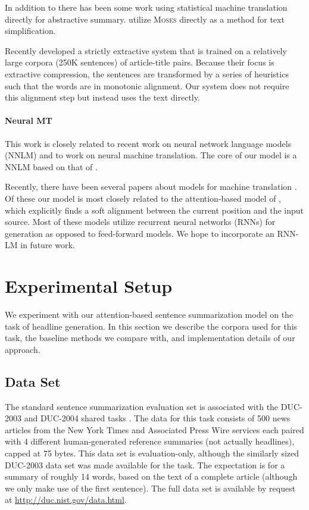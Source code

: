 \documentclass[11pt,a4paper]{article}
\begin{document}
In addition to  there has been some work
using  statistical machine translation directly for abstractive
summary.  utilize \textsc{Moses} directly
as a method for text simplification.

Recently  developed a strictly
extractive system that is trained on a relatively large corpora (250K
sentences) of article-title pairs. Because their
focus is extractive compression, the sentences are
transformed by a series of heuristics such that the words are in
monotonic alignment. Our system does not require this alignment step
but instead uses the text directly. 

\paragraph{Neural MT}

This work is closely related to recent work on neural network language
models (NNLM) and to work on neural machine translation. The core of
our model is a NNLM based on that of .

Recently, there have been several papers about models for machine
translation
\cite{kalchbrenner2013recurrent,cho2014learning,sutskever2014sequence}. Of
these our model is most closely related to the attention-based model
of , which explicitly finds a soft
alignment between the current position and the input source. Most of
these models utilize recurrent neural networks (RNNs) for generation
as opposed to feed-forward models. We hope to incorporate an RNN-LM 
in future work. 

 
\section{Experimental Setup}
\label{sec:methods}

We experiment with our attention-based sentence summarization model on the task
of headline generation. In this section we describe the
corpora used for this task, the baseline methods we compare with, and
implementation details of our approach.


\subsection{Data Set}

The standard sentence summarization evaluation set is associated with
the DUC-2003 and DUC-2004 shared tasks \cite{over2007duc}. The data
for this task consists of 500 news articles from the New York Times
and Associated Press Wire services each paired with 4 different
human-generated reference summaries (not actually headlines), capped at 75 bytes. This data set
is evaluation-only, although the similarly sized DUC-2003 data
set was made available for the task. The expectation is for a
summary of roughly 14 words, based on the text of a complete article (although we
only make use of the first sentence).  The full data set is available
by request at \url{http://duc.nist.gov/data.html}.
\end{document}
